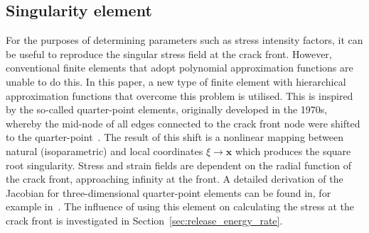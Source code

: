 \documentclass[onecolumn]{svjour3}
\begin{document}
\subsection{Singularity element}
\label{sec:singularity}
For the purposes of determining parameters such as stress intensity factors, it can be useful to reproduce the singular stress field at the crack front. However, conventional finite elements that adopt polynomial approximation functions are unable to do this. 
In this paper, a new type of finite element with hierarchical approximation functions that overcome this problem is utilised. This is inspired by the so-called quarter-point elements, originally developed in the 1970s, whereby the mid-node of all edges connected to the crack front node were shifted to the quarter-point~\cite{barsoum1976use,henshell1975crack}. 
% 
The result of this shift is a nonlinear mapping between natural (isoparametric) and local coordinates $\xi \rightarrow \mathbf x$ which produces the square root singularity. Stress and strain fields are dependent on the radial function of the crack front, approaching infinity at the front. 
% 
A detailed derivation of the Jacobian for three-dimensional quarter-point elements can be found in, for example in~\citep{nejati2015use}. 
The influence of using this element on calculating the stress at the crack front is investigated in Section~\ref{sec:release_energy_rate}.

\end{document}
